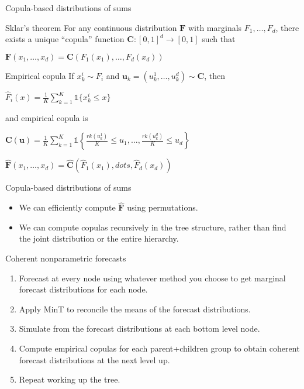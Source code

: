\documentclass[14pt]{beamer}
\makeatletter
\def\biz{\begin{itemize}[<+-| alert@+>]}
\def\eiz{\end{itemize}}
\makeatother
\begin{document}
\begin{frame}{Copula-based distributions of sums}
\fontsize{14}{14}\sf
\begin{block}{Sklar's theorem}
For any continuous distribution $\bm{F}$ with marginals $F_1,\dots,F_d$, there exists a unique ``copula'' function $\bm{C}: [0,1]^d \rightarrow [0,1]$ such that

\centerline{$\bm{F}(x_1,\dots,x_d) = \bm{C}(F_1(x_1),\dots,F_d(x_d))$}
\end{block}
\begin{block}{Empirical copula}
If $x_k^i\sim F_i$ and $\bm{u}_k=(u_k^1,\dots,u_k^d)\sim \bm{C}$, then
\centerline{$\hat{F}_i(x) = \frac{1}{K} \sum_{k=1}^K \mathds{1}\{x_k^i\le x\}$}
and empirical copula is
\centerline{$\bm{C}(\bm{u}) = \frac1K \sum_{k=1}^K \mathds{1}\left\{
  \frac{rk(u_k^1)}{K} \le u_1, \dots, \frac{rk(u_k^d)}{K} \le u_d\right\}
$}
\end{block}
\begin{alertblock}{}\centering
$\hat{\bm{F}}(x_1,\dots,x_d) = \hat{\bm{C}}(\hat{F}_1(x_1),dots,\hat{F}_d(x_d))$
\end{alertblock}
\end{frame}

\begin{frame}{Copula-based distributions of sums}
\biz
\item We can efficiently compute $\hat{\bm{F}}$ using permutations.
\item We can compute copulas recursively in the tree structure, rather than find the joint distribution or the entire hierarchy.
\eiz

\end{frame}

\begin{frame}{Coherent nonparametric forecasts}

\begin{enumerate}
\item Forecast at every node using whatever method you choose to get marginal forecast distributions for each node.
\item Apply MinT to reconcile the means of the forecast distributions.
\item  Simulate from the forecast distributions at each bottom level node.
\item Compute empirical copulas for each parent+children group to obtain coherent forecast distributions at the next level up.
\item Repeat working up the tree.
\end{enumerate}

\end{frame}
\end{document}
